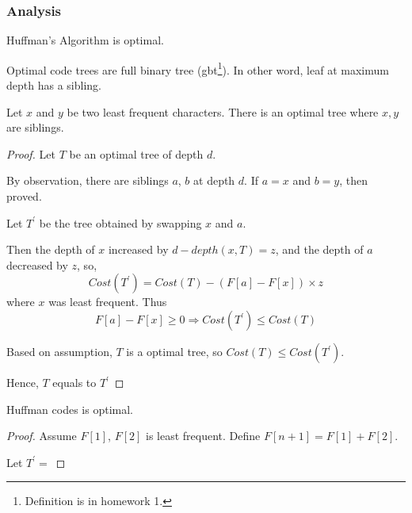 \subsubsection{Analysis}

\begin{claim}
    Huffman's Algorithm is optimal.
\end{claim}

\observation Optimal code trees are full binary tree (gbt\footnote{Definition is in homework 1.}).
In other word, leaf at maximum depth has a sibling.

\begin{lemma}
    Let $x$ and $y$ be two least frequent characters. There is an optimal tree
    where $x,y$ are siblings.
\end{lemma}

\begin{proof} Let $T$ be an optimal tree of depth $d$.

By observation, there are siblings $a$, $b$ at depth $d$.
If $a = x$ and $b = y$, then proved.

Let $T^\prime$ be the tree obtained by swapping $x$ and $a$.

Then the depth of $x$ increased by $d - depth(x,T) = z$, and
the depth of $a$ decreased by $z$, so,
\[Cost(T^\prime) = Cost(T) - (F[a]-F[x])\times z\]
where $x$ was least frequent. Thus
\[F[a] -F[x] \geq 0 \Rightarrow Cost(T^\prime) \leq Cost(T)\]

Based on assumption, $T$ is a optimal tree, so $Cost(T) \leq Cost(T^\prime)$.

Hence, $T$ equals to $T^\prime$
\end{proof}

\begin{theorem}
Huffman codes is optimal.
\end{theorem}

\begin{proof}
Assume $F[1]$, $F[2]$ is least frequent. Define $F[n+1] = F[1] + F[2]$.

Let $T^\prime = $
\end{proof}
